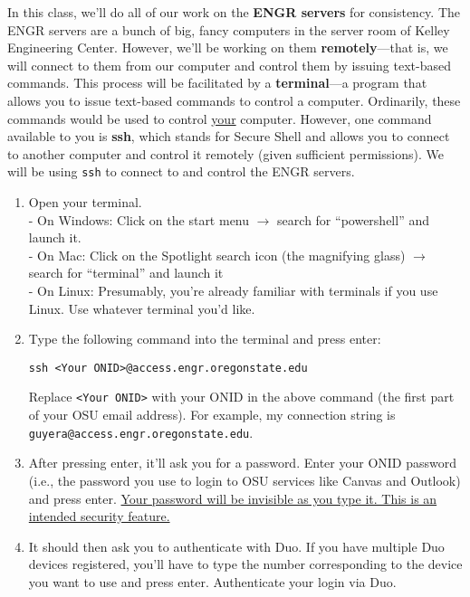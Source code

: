 \documentclass{article}
\begin{document}
In this class, we'll do all of our work on the \textbf{ENGR servers} for consistency. The ENGR servers are a bunch of big, fancy computers in the server room of Kelley Engineering Center. However, we'll be working on them \textbf{remotely}---that is, we will connect to them from our computer and control them by issuing text-based commands. This process will be facilitated by a \textbf{terminal}---a program that allows you to issue text-based commands to control a computer. Ordinarily, these commands would be used to control \ul{your} computer. However, one command available to you is \textbf{ssh}, which stands for Secure Shell and allows you to connect to another computer and control it remotely (given sufficient permissions). We will be using \texttt{ssh} to connect to and control the ENGR servers.

\begin{enumerate}
    \item Open your terminal.\\
    - On Windows: Click on the start menu $\rightarrow$ search for ``powershell'' and launch it.\\
    - On Mac: Click on the Spotlight search icon (the magnifying glass) $\rightarrow$ search for ``terminal'' and launch it\\
    - On Linux: Presumably, you're already familiar with terminals if you use Linux. Use whatever terminal you'd like.
    \item Type the following command into the terminal and press enter:

    \texttt{ssh <Your ONID>@access.engr.oregonstate.edu}

    Replace \texttt{<Your ONID>} with your ONID in the above command (the first part of your OSU email address). For example, my connection string is \texttt{guyera@access.engr.oregonstate.edu}.
    
    \item After pressing enter, it'll ask you for a password. Enter your ONID password (i.e., the password you use to login to OSU services like Canvas and Outlook) and press enter. \ul{Your password will be invisible as you type it. This is an intended security feature.}
    
    \item It should then ask you to authenticate with Duo. If you have multiple Duo devices registered, you'll have to type the number corresponding to the device you want to use and press enter. Authenticate your login via Duo.
\end{enumerate}
\end{document}
